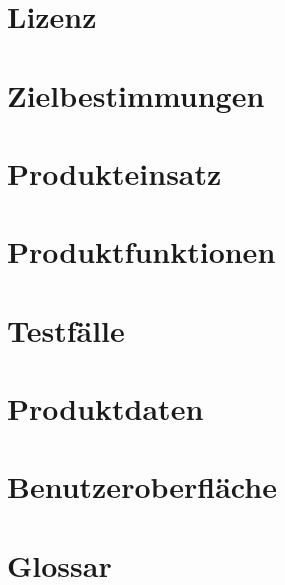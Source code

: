 \documentclass{report}
\begin{document}
	
	\tableofcontents
	
	\chapter{Lizenz}\label{chp:lizenz}
	
	
	\chapter{Zielbestimmungen}\label{chp:zielbestimmungen}
	
	
	\chapter{Produkteinsatz}\label{chp:produkteinsatz}
	

	\chapter{Produktfunktionen}\label{chp:produktfunktionen}
	

	\chapter{Testfälle}\label{chp:testfaelle}
	
	
	\chapter{Produktdaten}\label{chp:produktdaten}
	
	
	\chapter{Benutzeroberfläche}\label{chp:benutzeroberflaeche}
	
	
	\chapter{Glossar}\label{chp:glossar}
	
	
	
	
\end{document}
